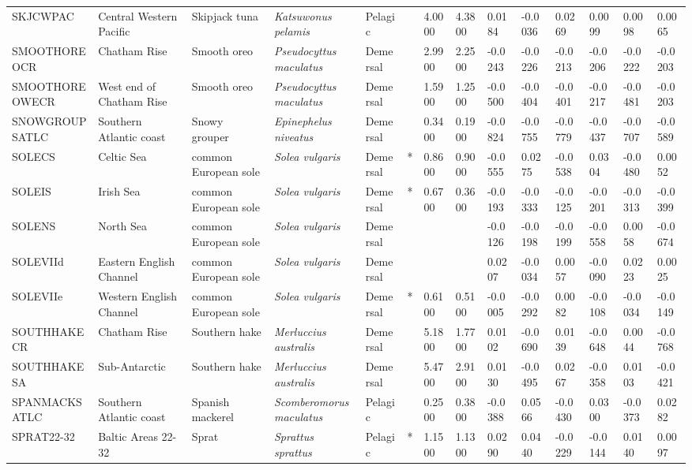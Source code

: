 \begin{longtable}{p{2.6cm}p{1.9cm}p{1.7cm}p{1.6cm}p{1cm}p{0.3cm}p{1cm}p{1cm}p{1cm}p{1.1cm}p{1cm}p{1.1cm}p{1cm}p{1.1cm}}
  SKJCWPAC & Central Western Pacific & Skipjack tuna & \textit{Katsuwonus pelamis} & Pelagic &   & 4.0000 & 4.3800 & 0.0184 & -0.0036 & 0.0269 & 0.0099 & 0.0098 & 0.0065 \\ 
  SMOOTHOREOCR & Chatham Rise & Smooth oreo & \textit{Pseudocyttus maculatus} & Demersal &   & 2.9900 & 2.2500 & -0.0243 & -0.0226 & -0.0213 & -0.0206 & -0.0222 & -0.0203 \\ 
  SMOOTHOREOWECR & West end of Chatham Rise & Smooth oreo & \textit{Pseudocyttus maculatus} & Demersal &   & 1.5900 & 1.2500 & -0.0500 & -0.0404 & -0.0401 & -0.0217 & -0.0481 & -0.0203 \\ 
  SNOWGROUPSATLC & Southern Atlantic coast & Snowy grouper & \textit{Epinephelus niveatus} & Demersal &   & 0.3400 & 0.1900 & -0.0824 & -0.0755 & -0.0779 & -0.0437 & -0.0707 & -0.0589 \\ 
  SOLECS & Celtic Sea & common European sole & \textit{Solea vulgaris} & Demersal & * & 0.8600 & 0.9000 & -0.0555 & 0.0275 & -0.0538 & 0.0304 & -0.0480 & 0.0052 \\ 
  SOLEIS & Irish Sea & common European sole & \textit{Solea vulgaris} & Demersal & * & 0.6700 & 0.3600 & -0.0193 & -0.0333 & -0.0125 & -0.0201 & -0.0313 & -0.0399 \\ 
  SOLENS & North Sea & common European sole & \textit{Solea vulgaris} & Demersal &  &  &  & -0.0126 & -0.0198 & -0.0199 & -0.0558 & 0.0058 & -0.0674 \\ 
  SOLEVIId & Eastern English Channel & common European sole & \textit{Solea vulgaris} & Demersal &  &  &  & 0.0207 & -0.0034 & 0.0057 & -0.0090 & 0.0223 & 0.0025 \\ 
  SOLEVIIe & Western English Channel & common European sole & \textit{Solea vulgaris} & Demersal & * & 0.6100 & 0.5100 & -0.0005 & -0.0292 & 0.0082 & -0.0108 & -0.0034 & -0.0149 \\ 
  SOUTHHAKECR & Chatham Rise & Southern hake & \textit{Merluccius australis} & Demersal &   & 5.1800 & 1.7700 & 0.0102 & -0.0690 & 0.0139 & -0.0648 & 0.0044 & -0.0768 \\ 
  SOUTHHAKESA & Sub-Antarctic & Southern hake & \textit{Merluccius australis} & Demersal &   & 5.4700 & 2.9100 & 0.0130 & -0.0495 & 0.0267 & -0.0358 & 0.0103 & -0.0421 \\ 
  SPANMACKSATLC & Southern Atlantic coast & Spanish mackerel & \textit{Scomberomorus maculatus} & Pelagic &   & 0.2500 & 0.3800 & -0.0388 & 0.0566 & -0.0430 & 0.0300 & -0.0373 & 0.0282 \\ 
  SPRAT22-32 & Baltic Areas 22-32 & Sprat & \textit{Sprattus sprattus} & Pelagic & * & 1.1500 & 1.1300 & 0.0290 & 0.0440 & -0.0229 & -0.0144 & 0.0140 & 0.0097 \\ 

\end{longtable}
